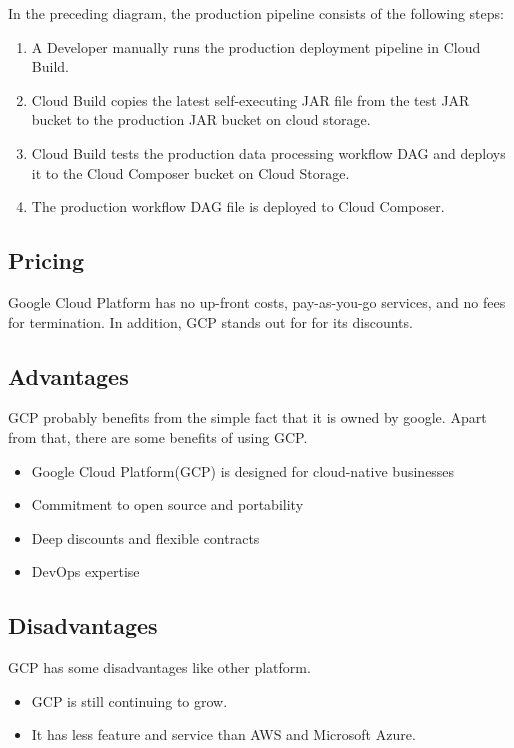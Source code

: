 In the preceding diagram, the production pipeline consists of the following steps: 
\begin{enumerate}
    \item A Developer manually runs the production deployment pipeline in Cloud Build.
    \item Cloud Build copies the latest self-executing JAR file from the test JAR bucket to the production JAR bucket on cloud storage. 
    \item Cloud Build tests the production data processing workflow DAG and deploys it to the Cloud Composer bucket on Cloud Storage. 
    \item The production workflow DAG file is deployed to Cloud Composer.
\end{enumerate}


%
%
\subsection{Pricing}
%
Google Cloud Platform has no up-front costs, pay-as-you-go services, and no fees for termination. In addition, GCP stands out for for its discounts. 
%
\subsection{Advantages}
%
GCP probably benefits from the simple fact that it is owned by google. Apart from that, there are some benefits of using GCP. 
\begin{itemize}
    \item Google Cloud Platform(GCP) is designed for cloud-native businesses
    \item Commitment to open source and portability
    \item Deep discounts and flexible contracts
 \item DevOps expertise

\end{itemize}
%
\subsection{Disadvantages}
%
GCP has some disadvantages like other platform.

\begin{itemize}
    \item GCP is still continuing to grow.
    \item It has less feature and service than AWS and Microsoft Azure. 
\end{itemize}
%